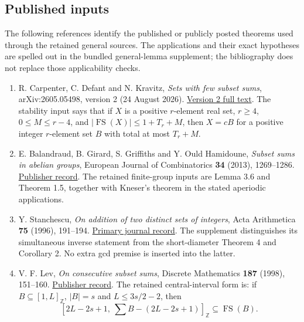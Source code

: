 \documentclass[11pt,letterpaper]{article}
\newcommand{\FS}{\operatorname{FS}}
\newcommand{\Z}{\mathbb Z}\newcommand{\R}{\mathbb R}
\newcommand{\card}[1]{\lvert#1\rvert}
\theoremstyle{definition}\newtheorem{definition}[theorem]{Definition}
\begin{document}
\subsection{Published inputs}
The following references identify the published or publicly posted theorems used through the retained general sources. The applications and their exact hypotheses are spelled out in the bundled general-lemma supplement; the bibliography does not replace those applicability checks.
\begin{enumerate}
\item R. Carpenter, C. Defant and N. Kravitz, \emph{Sets with few subset sums}, arXiv:2605.05498, version 2 (24 August 2026). \href{https://arxiv.org/html/2605.05498v2}{Version 2 full text}. The stability input says that if $X$ is a positive $r$-element real set, $r\ge4$, $0\le M\le r-4$, and $\card{\FS(X)}\le1+T_r+M$, then $X=cB$ for a positive integer $r$-element set $B$ with total at most $T_r+M$.
\item E. Balandraud, B. Girard, S. Griffiths and Y. Ould Hamidoune, \emph{Subset sums in abelian groups}, European Journal of Combinatorics \textbf{34} (2013), 1269--1286. \href{https://doi.org/10.1016/j.ejc.2013.05.009}{Publisher record}. The retained finite-group inputs are Lemma 3.6 and Theorem 1.5, together with Kneser's theorem in the stated aperiodic applications.
\item Y. Stanchescu, \emph{On addition of two distinct sets of integers}, Acta Arithmetica \textbf{75} (1996), 191--194. \href{https://doi.org/10.4064/aa-75-2-191-194}{Primary journal record}. The supplement distinguishes its simultaneous inverse statement from the short-diameter Theorem 4 and Corollary 2. No extra gcd premise is inserted into the latter.
\item V. F. Lev, \emph{On consecutive subset sums}, Discrete Mathematics \textbf{187} (1998), 151--160. \href{https://doi.org/10.1016/S0012-365X(98)80006-X}{Publisher record}. The retained central-interval form is: if $B\subseteq[1,L]_{\Z}$, $\card B=s$ and $L\le3s/2-2$, then
\[
[2L-2s+1,\ \sum B-(2L-2s+1)]_{\Z}\subseteq\FS(B).
\]
\end{enumerate}
\end{document}
